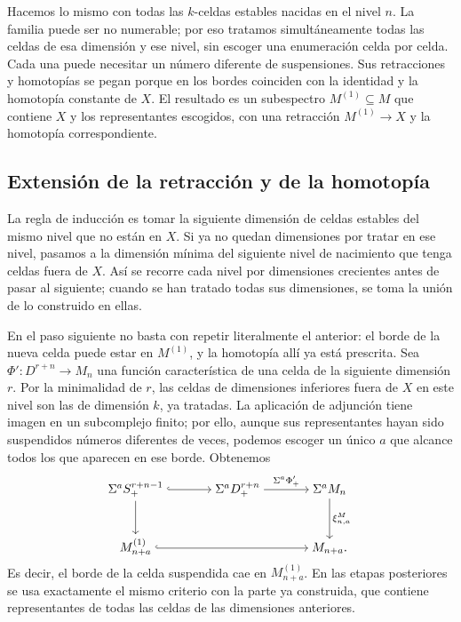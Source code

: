 Hacemos lo mismo con todas las $k$-celdas estables nacidas en el nivel $n$. La familia puede ser no numerable; por eso tratamos simultáneamente todas las celdas de esa dimensión y ese nivel, sin escoger una enumeración celda por celda. Cada una puede necesitar un número diferente de suspensiones. Sus retracciones y homotopías se pegan porque en los bordes coinciden con la identidad y la homotopía constante de $X$. El resultado es un subespectro $M^{(1)}\subseteq M$ que contiene $X$ y los representantes escogidos, con una retracción $M^{(1)}\to X$ y la homotopía correspondiente.

\subsection{Extensión de la retracción y de la homotopía}

La regla de inducción es tomar la siguiente dimensión de celdas estables del mismo nivel que no están en $X$. Si ya no quedan dimensiones por tratar en ese nivel, pasamos a la dimensión mínima del siguiente nivel de nacimiento que tenga celdas fuera de $X$. Así se recorre cada nivel por dimensiones crecientes antes de pasar al siguiente; cuando se han tratado todas sus dimensiones, se toma la unión de lo construido en ellas.

En el paso siguiente no basta con repetir literalmente el anterior: el borde de la nueva celda puede estar en $M^{(1)}$, y la homotopía allí ya está prescrita. Sea $\Phi'\colon D^{r+n}\to M_n$ una función característica de una celda de la siguiente dimensión $r$. Por la minimalidad de $r$, las celdas de dimensiones inferiores fuera de $X$ en este nivel son las de dimensión $k$, ya tratadas. La aplicación de adjunción tiene imagen en un subcomplejo finito; por ello, aunque sus representantes hayan sido suspendidos números diferentes de veces, podemos escoger un único $a$ que alcance todos los que aparecen en ese borde. Obtenemos
\[
\begin{tikzcd}[cramped,column sep=large,row sep=large]
\Sigma^aS^{r+n-1}_+ \arrow[r,hook] \arrow[d]
& \Sigma^aD^{r+n}_+ \arrow[r,"\Sigma^a\Phi'_+"]
& \Sigma^aM_n \arrow[d,"\xi^M_{n,a}"]\\
M^{(1)}_{n+a} \arrow[rr,hook] && M_{n+a}.
\end{tikzcd}
\]
Es decir, el borde de la celda suspendida cae en $M^{(1)}_{n+a}$. En las etapas posteriores se usa exactamente el mismo criterio con la parte ya construida, que contiene representantes de todas las celdas de las dimensiones anteriores.

